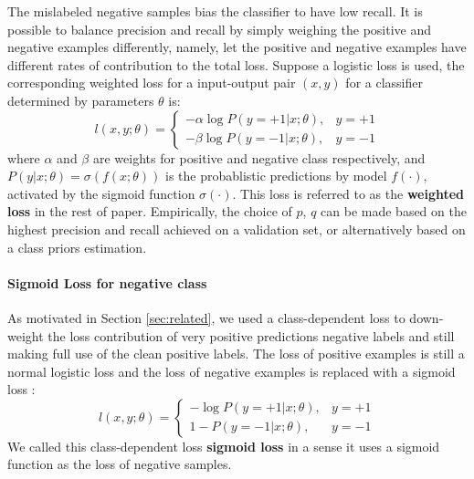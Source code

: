 The mislabeled negative samples bias the classifier to have low recall.
It is possible to balance precision and recall by simply weighing the positive and negative examples differently, namely, let the positive and negative examples have different rates of contribution to the total loss.
Suppose a logistic loss is used, the corresponding weighted loss for a input-output pair $(x, y)$ for a classifier determined by parameters $\theta$ is:
\[
  l(x, y; \theta) =
    \begin{cases}
      - \alpha \log P(y=+1 \vert x; \theta), & y = +1 \\
      - \beta \log P(y=-1 \vert x; \theta), & y = -1
    \end{cases}
\]
where $\alpha$ and $\beta$ are weights for positive and negative class respectively, and $P(y\vert x; \theta)=\sigma(f(x; \theta))$ is the probablistic predictions by model $f(\cdot)$, activated by the sigmoid function $\sigma(\cdot)$.
This loss is referred to as the \textbf{weighted loss} in the rest of paper.
Empirically, the choice of $p$, $q$ can be made based on the highest precision and recall achieved on a validation set, or alternatively based on a class priors estimation\cite{du2014class}.



\paragraph{Sigmoid Loss for negative class}

As motivated in Section \ref{sec:related}, we used a class-dependent loss to down-weight the loss contribution of very positive predictions negative labels and still making full use of the clean positive labels.
The loss of positive examples is still a normal logistic loss and the loss of negative examples is replaced with a sigmoid loss \cite{tax2016class}:
\[
  l(x, y; \theta) =
    \begin{cases}
      - \log P(y=+1 \vert x; \theta), & y = +1 \\
      1 - P(y=-1 \vert x; \theta), & y = -1
    \end{cases}
\]
We called this class-dependent loss \textbf{sigmoid loss} in a sense it uses a sigmoid function as the loss of negative samples.

